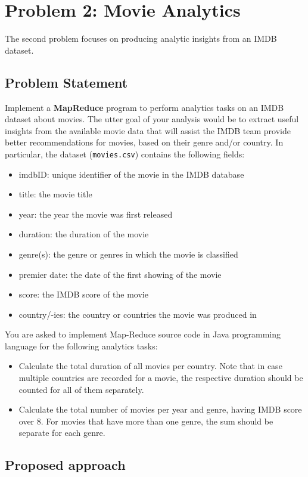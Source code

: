 \documentclass[acmlarge]{acmart}
\begin{document}
\section{Problem 2: Movie Analytics}
\label{sec:problem2}
The second problem focuses on producing analytic insights from an IMDB dataset.


\subsection{Problem Statement}
Implement a \textbf{MapReduce} program to perform analytics tasks on an IMDB dataset about movies. The utter goal of your analysis would be to extract useful insights from the available movie data that will assist the IMDB team provide better recommendations for movies, based on their genre and/or country. In particular, the dataset (\texttt{movies.csv}) contains the following fields:
\begin{itemize}
  \item imdbID: unique identifier of the movie in the IMDB database
  \item title: the movie title
  \item year: the year the movie was first released
  \item duration: the duration of the movie
  \item genre(s): the genre or genres in which the movie is classified
  \item premier date: the date of the first showing of the movie
  \item score: the IMDB score of the movie
  \item country/-ies: the country or countries the movie was produced in
\end{itemize}

You are asked to implement Map-Reduce source code in Java programming language for the following analytics tasks:
\begin{itemize}
  \item Calculate the total duration of all movies per country. Note that in case multiple countries are recorded for a movie, the respective duration should be counted for all of them separately.
  \item Calculate the total number of movies per year and genre, having IMDB score over 8. For movies that have more than one genre, the sum should be separate for each genre.
\end{itemize}

\subsection{Proposed approach}
\end{document}
